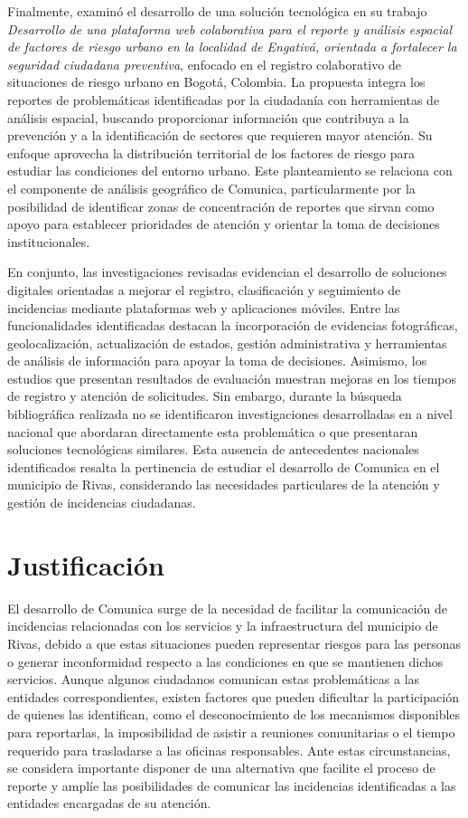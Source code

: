 Finalmente, \textcite{moreno2026desarrollo} examinó el desarrollo de una solución tecnológica en su trabajo \textit{Desarrollo de una plataforma web colaborativa para el reporte y análisis espacial de factores de riesgo urbano en la localidad de Engativá, orientada a fortalecer la seguridad ciudadana preventiva}, enfocado en el registro colaborativo de situaciones de riesgo urbano en Bogotá, Colombia. La propuesta integra los reportes de problemáticas identificadas por la ciudadanía con herramientas de análisis espacial, buscando proporcionar información que contribuya a la prevención y a la identificación de sectores que requieren mayor atención. Su enfoque aprovecha la distribución territorial de los factores de riesgo para estudiar las condiciones del entorno urbano. Este planteamiento se relaciona con el componente de análisis geográfico de Comunica, particularmente por la posibilidad de identificar zonas de concentración de reportes que sirvan como apoyo para establecer prioridades de atención y orientar la toma de decisiones institucionales.

En conjunto, las investigaciones revisadas evidencian el desarrollo de soluciones digitales orientadas a mejorar el registro, clasificación y seguimiento de incidencias mediante plataformas web y aplicaciones móviles. Entre las funcionalidades identificadas destacan la incorporación de evidencias fotográficas, geolocalización, actualización de estados, gestión administrativa y herramientas de análisis de información para apoyar la toma de decisiones. Asimismo, los estudios que presentan resultados de evaluación muestran mejoras en los tiempos de registro y atención de solicitudes. Sin embargo, durante la búsqueda bibliográfica realizada no se identificaron investigaciones desarrolladas en a nivel nacional que abordaran directamente esta problemática o que presentaran soluciones tecnológicas similares. Esta ausencia de antecedentes nacionales identificados resalta la pertinencia de estudiar el desarrollo de Comunica en el municipio de Rivas, considerando las necesidades particulares de la atención y gestión de incidencias ciudadanas.

\section{Justificación}
\label{subsec:justificacion}
El desarrollo de Comunica surge de la necesidad de facilitar la comunicación de incidencias relacionadas con los servicios y la infraestructura del municipio de Rivas, debido a que estas situaciones pueden representar riesgos para las personas o generar inconformidad respecto a las condiciones en que se mantienen dichos servicios. Aunque algunos ciudadanos comunican estas problemáticas a las entidades correspondientes, existen factores que pueden dificultar la participación de quienes las identifican, como el desconocimiento de los mecanismos disponibles para reportarlas, la imposibilidad de asistir a reuniones comunitarias o el tiempo requerido para trasladarse a las oficinas responsables. Ante estas circunstancias, se considera importante disponer de una alternativa que facilite el proceso de reporte y amplíe las posibilidades de comunicar las incidencias identificadas a las entidades encargadas de su atención.

